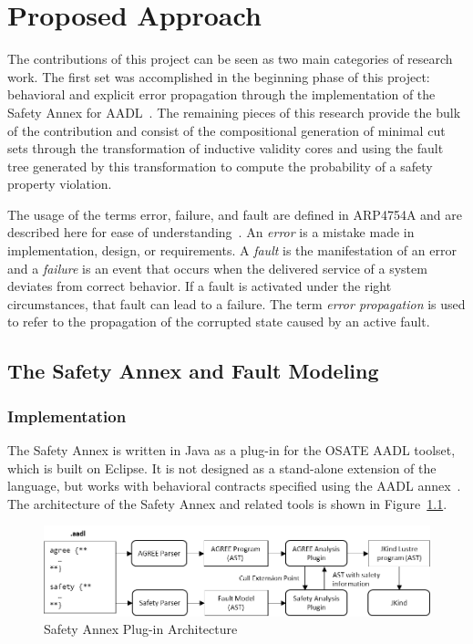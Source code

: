 \chapter{Proposed Approach}
\label{ch:prop}

The contributions of this project can be seen as two main categories of research work. The first set was accomplished in the beginning phase of this project: behavioral and explicit error propagation through the implementation of the Safety Annex for AADL~\cite{Stewart17:IMBSA,stewart2020safety}. The remaining pieces of this research provide the bulk of the contribution and consist of the compositional generation of minimal cut sets through the transformation of inductive validity cores and using the fault tree generated by this transformation to compute the probability of a safety property violation. 

The usage of the terms error, failure, and fault are defined in ARP4754A and are described here for ease of understanding~\cite{SAE:ARP4754A}. An \textit{error} is a mistake made in implementation, design, or requirements. A \textit{fault} is the manifestation of an error and a \textit{failure} is an event that occurs when the delivered service of a system deviates from correct behavior. If a fault is activated under the right circumstances, that fault can lead to a failure. The term \textit{error propagation} is used to refer to the propagation of the corrupted state caused by an active fault.

\section{The Safety Annex and Fault Modeling}
\subsection{Implementation}
The Safety Annex is written in Java as a plug-in for the OSATE AADL toolset, which is built on Eclipse.  It is not designed as a stand-alone extension of the language, but works with behavioral contracts specified using the \agree AADL annex~\cite{NFM2012:CoGaMiWhLaLu}. 
The architecture of the Safety Annex and related tools is shown in Figure~\ref{fig:plugin-arch}.

\begin{figure}[h!]
	\begin{center}
		\includegraphics[width=\textwidth]{images/arch.png}
	\end{center}
	\caption{Safety Annex Plug-in Architecture}
	\label{fig:plugin-arch}
\end{figure}

